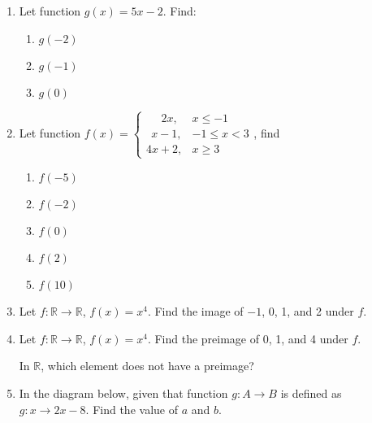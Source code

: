 \documentclass{report}
\begin{document}
\begin{enumerate}
  \item Let function $g(x) = 5x-2$. Find:
        \begin{enumerate}
          \item $g(-2)$
          \item $g(-1)$
          \item $g(0)$
        \end{enumerate}

  \item Let function $f(x) = \left\{\begin{array}{ll}
            \ \ \ \ \ \ 2x, & x \leq -1     \\
            \ \ x-1,        & -1 \leq x < 3 \\
            4x + 2,         & x \geq 3
          \end{array}\right.$, find

        \begin{enumerate}
          \item $f(-5)$
          \item $f(-2)$
          \item $f(0)$
          \item $f(2)$
          \item $f(10)$
        \end{enumerate}

  \item Let $f: \mathbb{R} \to \mathbb{R}$, $f(x) = x^4$. Find the image of $-1$, 0, 1,
        and 2 under $f$.

  \item Let $f: \mathbb{R} \to \mathbb{R}$, $f(x) = x^4$. Find the preimage of 0, 1,
        and 4 under $f$.

        In $\mathbb{R}$, which element does not have a preimage?

  \item In the diagram below, given that function $g: A \to B$ is defined as $g: x \to
          2x - 8$. Find the value of $a$ and $b$.
        \begin{center}
        \end{center}


\end{enumerate}
\end{document}
